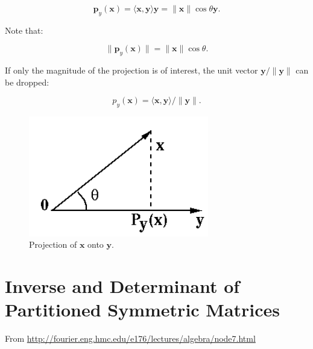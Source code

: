 \documentclass[10pt,b5paper,titlepage]{book}
\begin{document}
\begin{itemize}
        \begin{equation}
            \mathbf{p}_{y}(\mathbf{x})
            = \langle \mathbf{x}, \mathbf{y} \rangle \mathbf{y}
            = \|\mathbf{x}\| \cos \theta \mathbf{y}
        .\end{equation}

        Note that:

        \begin{equation}
            \|\mathbf{p}_{y}(\mathbf{x})\|
            = \|\mathbf{x}\| \cos \theta
        .\end{equation}

        If only the magnitude of the projection is of interest, the
        unit vector $\mathbf{y} / \|\mathbf{y}\|$ can be dropped:

        \begin{equation}
            p_{y}(\mathbf{x}) = \langle \mathbf{x}, \mathbf{y} \rangle / \|\mathbf{y}\|
        .\end{equation}

        \begin{figure}[htpb]
            \centering
            \includegraphics[width=0.7\textwidth]{./img/projection.png}
            \caption{Projection of $\mathbf{x}$ onto $\mathbf{y}$.}
            \label{fig:projection-png}
        \end{figure}





\end{itemize}







\chapter{Inverse and Determinant of Partitioned Symmetric Matrices}
From \url{http://fourier.eng.hmc.edu/e176/lectures/algebra/node7.html}\\
\end{document}
